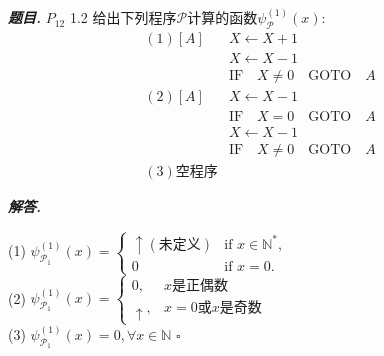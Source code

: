 \documentclass[10pt, a4paper, oneside]{ctexart}
\newenvironment{problem}{\begin{framed}\par\noindent\textbf{\textit{题目. }}}{\end{framed}\par}
\newenvironment{solution}{%
  \par\noindent\textbf{\textit{解答. }}\ignorespaces
}{%
  \hfill\ensuremath{\square}\par
}
\begin{document}
    \begin{problem}
    $P_{12}$ 1.2 给出下列程序$\mathscr{P}$计算的函数$\psi_{\mathscr{P}}^{(1)}(x)$:
    \begin{align*}
        (1) [A]&X\leftarrow X+1\\
        &X\leftarrow X-1\\
        &\text{IF}\quad X\neq 0 \quad \text{GOTO}\quad  A\\
        (2) [A]&X\leftarrow X-1\\
        &\text{IF}\quad X=0 \quad \text{GOTO}\quad  A\\
        &X\leftarrow X-1\\
        &\text{IF}\quad X\neq 0 \quad \text{GOTO}\quad  A\\
        (3) \text{空程序}&
    \end{align*}
    \end{problem}
    \begin{solution}
    (1) $\psi_{\mathscr{P}_1}^{(1)}(x) =
    \begin{cases}
        \uparrow (\text{未定义})  & \text{if } x \in \mathbb{N}^*, \\
      0 & \text{if } x = 0.
    \end{cases}$\\
    (2) $\psi_{\mathscr{P}_1}^{(1)}(x) =\begin{cases}0,&x\text{是正偶数}\\ \uparrow , &x=0 \text{或}x\text{是奇数}\end{cases} $\\
    (3) $\psi_{\mathscr{P}_1}^{(1)}(x)=0, \forall x\in \mathbb{N}$
    \end{solution}
\end{document}

